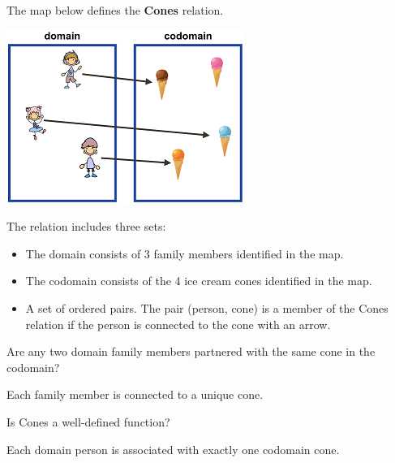 \documentclass{ximera}
\begin{document}
\begin{definition}
  The map below defines the \textbf{Cones} relation. 
  
  

    \includegraphics[width=293px,height=214px]{pics/r20.png}

  
 

  The  relation includes three sets:
    \begin{itemize}
    \item The domain consists of 3 family members identified in the map.
    \item The codomain consists of the 4 ice cream cones identified in the map.
    \item A set of ordered pairs. The pair (person, cone) is a member of the Cones relation if the person is connected to the cone with an arrow.
    \end{itemize}

  
  
\end{definition}







\begin{exercise}

Are any two domain family members partnered with the same cone in the codomain?

  \begin{multipleChoice}
  \end{multipleChoice}
  \begin{feedback}
Each family member is connected to a unique cone.
  \end{feedback}
\end{exercise}






\begin{exercise}
Is Cones a well-defined function?
  \begin{multipleChoice}
  \end{multipleChoice}
  \begin{feedback}
Each domain person is associated with exactly one codomain cone.
  \end{feedback}
\end{exercise}
\end{document}
